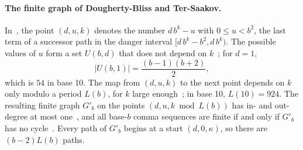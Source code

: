 \paragraph{The finite graph of Dougherty-Bliss and Ter-Saakov.}
In~\cite{dbts}, the point $(d, u, k)$ denotes the number $d\,b^k - u$ with $0 \le u < b^2$, the last
term of a successor path in the danger interval $[d\,b^k - b^2, d\,b^k)$. The possible values of $u$
form a set $U(b, d)$ that does not depend on $k$~\cite[Lemma~6]{dbts}; for $d = 1$,
\[
  |U(b, 1)| = \frac{(b-1)(b+2)}{2},
\]
which is $54$ in base 10. The map from $(d, u, k)$ to the next point depends on $k$ only modulo a
period $L(b)$, for $k$ large enough~\cite[Proposition~8]{dbts}; in base 10, $L(10) = 924$. The
resulting finite graph $G'_b$ on the points $(d, u, k \bmod L(b))$ has in- and out-degree at most
one~\cite[Lemma~10]{dbts}, and all base-$b$ comma sequences are finite if and only if $G'_b$ has no
cycle~\cite[Proposition~11]{dbts}. Every path of $G'_b$ begins at a start $(d, 0, \kappa)$, so there
are $(b-2) L(b)$ paths.
